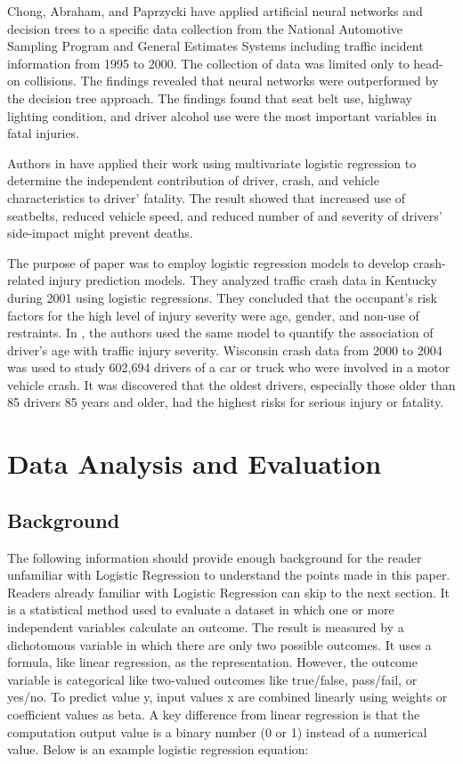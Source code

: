 \documentclass[conference]{IEEEtran}
\begin{document}
Chong, Abraham, and Paprzycki \cite{chong2004traffic} have applied artificial neural networks and decision trees to a specific data collection from the National Automotive Sampling Program and General Estimates Systems including traffic incident information from 1995 to 2000. The collection of data was limited only to head-on collisions. The findings revealed that neural networks were outperformed by the decision tree approach. The findings found that seat belt use, highway lighting condition, and driver alcohol use were the most important variables in fatal injuries.

Authors in \cite{Bedard} have applied their work using multivariate logistic regression to determine the independent contribution of driver, crash, and vehicle characteristics to driver' fatality. The result showed that increased use of seatbelts, reduced vehicle speed, and reduced number of and severity of drivers' side-impact might prevent deaths.

The purpose of paper \cite{SingletonFactors} was to employ logistic regression models to develop crash-related injury prediction models. They analyzed traffic crash data in Kentucky during 2001 using logistic regressions. They concluded that the occupant’s risk factors for the high level of injury severity were age, gender, and non-use of restraints. In \cite{ associationHanrahan}, the authors used the same model to quantify the association of driver’s age with traffic injury severity. Wisconsin crash data from 2000 to 2004 was used to study 602,694 drivers of a car or truck who were involved in a motor vehicle crash. It was discovered that the oldest drivers, especially those older than 85 drivers 85 years and older, had the highest risks for serious injury or fatality.


\section{Data Analysis and Evaluation}
\subsection{Background}
The following information should provide enough background for the reader unfamiliar with Logistic Regression to understand the points made in this paper. Readers already familiar with Logistic Regression can skip to the next section. It is a statistical method used to evaluate a dataset in which one or more independent variables calculate an outcome. The result is measured by a dichotomous variable in which there are only two possible outcomes. It uses a formula, like linear regression, as the representation. However, the outcome variable is categorical like two-valued outcomes like true/false, pass/fail, or yes/no. To predict value y, input values x are combined linearly using weights or coefficient values as beta. A key difference from linear regression is that the computation output value is a binary number (0 or 1) instead of a numerical value.  Below is an example logistic regression equation:
 
\end{document}
